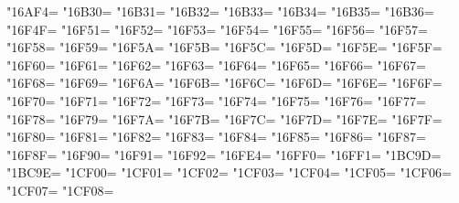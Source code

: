 \XeTeXcharclass"16AF4=\KclassCM
\XeTeXcharclass"16B30=\KclassCM
\XeTeXcharclass"16B31=\KclassCM
\XeTeXcharclass"16B32=\KclassCM
\XeTeXcharclass"16B33=\KclassCM
\XeTeXcharclass"16B34=\KclassCM
\XeTeXcharclass"16B35=\KclassCM
\XeTeXcharclass"16B36=\KclassCM
\XeTeXcharclass"16F4F=\KclassCM
\XeTeXcharclass"16F51=\KclassCM
\XeTeXcharclass"16F52=\KclassCM
\XeTeXcharclass"16F53=\KclassCM
\XeTeXcharclass"16F54=\KclassCM
\XeTeXcharclass"16F55=\KclassCM
\XeTeXcharclass"16F56=\KclassCM
\XeTeXcharclass"16F57=\KclassCM
\XeTeXcharclass"16F58=\KclassCM
\XeTeXcharclass"16F59=\KclassCM
\XeTeXcharclass"16F5A=\KclassCM
\XeTeXcharclass"16F5B=\KclassCM
\XeTeXcharclass"16F5C=\KclassCM
\XeTeXcharclass"16F5D=\KclassCM
\XeTeXcharclass"16F5E=\KclassCM
\XeTeXcharclass"16F5F=\KclassCM
\XeTeXcharclass"16F60=\KclassCM
\XeTeXcharclass"16F61=\KclassCM
\XeTeXcharclass"16F62=\KclassCM
\XeTeXcharclass"16F63=\KclassCM
\XeTeXcharclass"16F64=\KclassCM
\XeTeXcharclass"16F65=\KclassCM
\XeTeXcharclass"16F66=\KclassCM
\XeTeXcharclass"16F67=\KclassCM
\XeTeXcharclass"16F68=\KclassCM
\XeTeXcharclass"16F69=\KclassCM
\XeTeXcharclass"16F6A=\KclassCM
\XeTeXcharclass"16F6B=\KclassCM
\XeTeXcharclass"16F6C=\KclassCM
\XeTeXcharclass"16F6D=\KclassCM
\XeTeXcharclass"16F6E=\KclassCM
\XeTeXcharclass"16F6F=\KclassCM
\XeTeXcharclass"16F70=\KclassCM
\XeTeXcharclass"16F71=\KclassCM
\XeTeXcharclass"16F72=\KclassCM
\XeTeXcharclass"16F73=\KclassCM
\XeTeXcharclass"16F74=\KclassCM
\XeTeXcharclass"16F75=\KclassCM
\XeTeXcharclass"16F76=\KclassCM
\XeTeXcharclass"16F77=\KclassCM
\XeTeXcharclass"16F78=\KclassCM
\XeTeXcharclass"16F79=\KclassCM
\XeTeXcharclass"16F7A=\KclassCM
\XeTeXcharclass"16F7B=\KclassCM
\XeTeXcharclass"16F7C=\KclassCM
\XeTeXcharclass"16F7D=\KclassCM
\XeTeXcharclass"16F7E=\KclassCM
\XeTeXcharclass"16F7F=\KclassCM
\XeTeXcharclass"16F80=\KclassCM
\XeTeXcharclass"16F81=\KclassCM
\XeTeXcharclass"16F82=\KclassCM
\XeTeXcharclass"16F83=\KclassCM
\XeTeXcharclass"16F84=\KclassCM
\XeTeXcharclass"16F85=\KclassCM
\XeTeXcharclass"16F86=\KclassCM
\XeTeXcharclass"16F87=\KclassCM
\XeTeXcharclass"16F8F=\KclassCM
\XeTeXcharclass"16F90=\KclassCM
\XeTeXcharclass"16F91=\KclassCM
\XeTeXcharclass"16F92=\KclassCM
\XeTeXcharclass"16FE4=\KclassCM
\XeTeXcharclass"16FF0=\KclassCM
\XeTeXcharclass"16FF1=\KclassCM
\XeTeXcharclass"1BC9D=\KclassCM
\XeTeXcharclass"1BC9E=\KclassCM
\XeTeXcharclass"1CF00=\KclassCM
\XeTeXcharclass"1CF01=\KclassCM
\XeTeXcharclass"1CF02=\KclassCM
\XeTeXcharclass"1CF03=\KclassCM
\XeTeXcharclass"1CF04=\KclassCM
\XeTeXcharclass"1CF05=\KclassCM
\XeTeXcharclass"1CF06=\KclassCM
\XeTeXcharclass"1CF07=\KclassCM
\XeTeXcharclass"1CF08=\KclassCM

